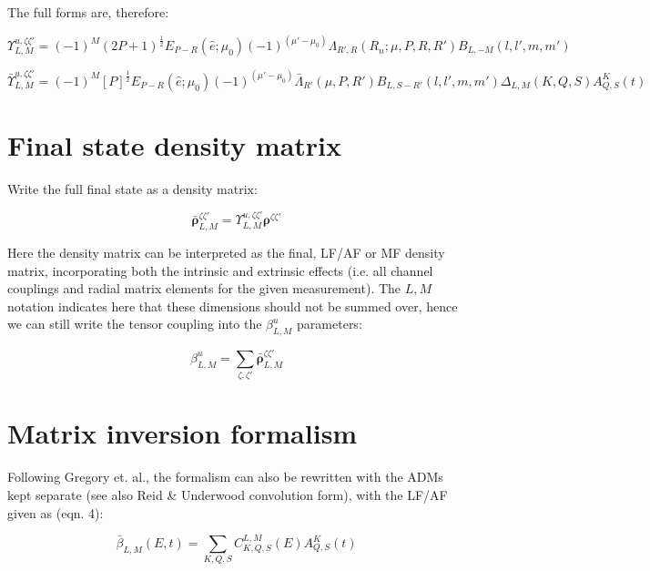 The full forms are, therefore:

\begin{equation}
\varUpsilon_{L,M}^{u,\zeta\zeta'}=(-1)^{M}(2P+1)^{\frac{1}{2}}E_{P-R}(\hat{e};\mu_{0})(-1)^{(\mu'-\mu_{0})}\Lambda_{R',R}(R_{\hat{n}};\mu,P,R,R')B_{L,-M}(l,l',m,m')
\end{equation}

\begin{equation}
\bar{\varUpsilon}_{L,M}^{u,\zeta\zeta'}=(-1)^{M}[P]^{\frac{1}{2}}E_{P-R}(\hat{e};\mu_{0})(-1)^{(\mu'-\mu_{0})}\bar{\Lambda}_{R'}(\mu,P,R')B_{L,S-R'}(l,l',m,m')\Delta_{L,M}(K,Q,S)A_{Q,S}^{K}(t)
\end{equation}

\section{Final state density matrix}

Write the full final state as a density matrix:

\begin{equation}
\mathbf{\bar{\rho}}_{L,M}^{\zeta\zeta'}=\varUpsilon_{L,M}^{u,\zeta\zeta'}\mathbf{\rho}^{\zeta\zeta'}
\end{equation}

Here the density matrix can be interpreted as the final, LF/AF or
MF density matrix, incorporating both the intrinsic and extrinsic
effects (i.e. all channel couplings and radial matrix elements for
the given measurement). The $L,M$notation indicates here that these
dimensions should not be summed over, hence we can still write the
tensor coupling into the $\beta_{L,M}^{u}$ parameters:

\begin{equation}
\beta_{L,M}^{u}=\sum_{\zeta,\zeta'}\mathbf{\bar{\rho}}_{L,M}^{\zeta\zeta'}
\end{equation}


\section{Matrix inversion formalism\labe}

Following Gregory et. al., the formalism can also be rewritten with
the ADMs kept separate (see also Reid \& Underwood convolution form),
with the LF/AF given as (eqn. 4):

\begin{equation}
\bar{\beta}_{L,M}(E,t)=\sum_{K,Q,S}C_{K,Q,S}^{L,M}(E)A_{Q,S}^{K}(t)
\end{equation}

